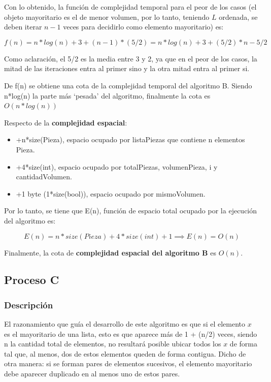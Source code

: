 \documentclass{article}
\begin{document}
Con lo obtenido, la función de complejidad temporal para el peor de los casos (el objeto mayoritario es el de menor volumen, por lo tanto, teniendo \(L\) ordenada, se deben iterar \(n-1\) veces para decidirlo como elemento mayoritario) es:

\begin{equation}
    f(n) = n*log(n) + 3 + (n-1)*(5/2) = n*log(n) + 3 + (5/2)*n - 5/2
\end{equation}

Como aclaración, el 5/2 es la media entre 3 y 2, ya que en el peor de los casos, 
la mitad de las iteraciones entra al primer sino y la otra mitad entra al primer si.

De f(n) se obtiene una cota de la complejidad temporal del algoritmo B. 
Siendo n*log(n) la parte más ‘pesada’ del algoritmo, finalmente la cota es \(O(n*log(n))\)

Respecto de la \textbf{complejidad espacial}:

\begin{itemize}
    \item +n*size(Pieza), espacio ocupado por listaPiezas que contiene n elementos Pieza.
    \item +4*size(int), espacio ocupado por totalPiezas, volumenPieza, i y cantidadVolumen.
    \item +1 byte (1*size(bool)), espacio ocupado por mismoVolumen.
\end{itemize}

Por lo tanto, se tiene que E(n), función de espacio total ocupado por la ejecución del algoritmo es:

\begin{equation}
    E(n) = n*size(Pieza) + 4*size(int) + 1 \implies E(n) = O(n)   
\end{equation}

Finalmente, la cota de \textbf{complejidad espacial del algoritmo B} es \(O(n)\).

\newpage
\subsection{Proceso C}
\subsubsection{Descripción}

El razonamiento que guía el desarrollo de este algoritmo es que si el elemento \(x\) es el mayoritario de una lista, esto es que aparece más de 1 + (n/2) veces, siendo n la cantidad total de elementos, no resultará posible ubicar todos los \(x\) de forma tal que, al menos, dos de estos elementos queden de forma contigua. 
Dicho de otra manera: si se forman pares de elementos sucesivos, el elemento mayoritario debe aparecer duplicado en al menos uno de estos pares.
\end{document}
